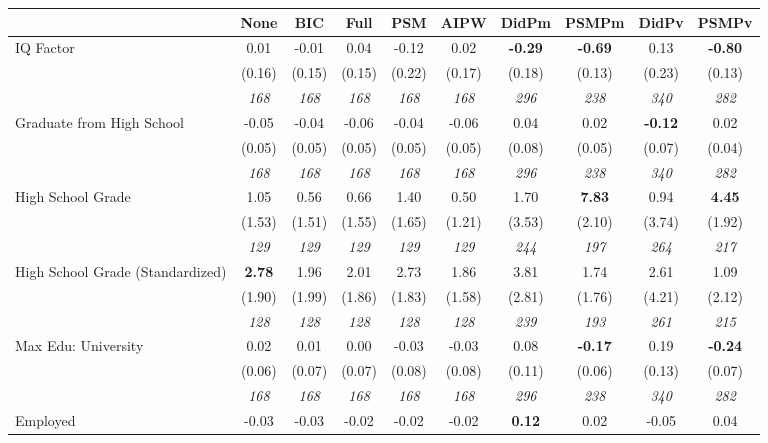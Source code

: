 \begin{tabular}{l c c c c c c c c c}
\toprule
 & None & BIC & Full & PSM & AIPW & DidPm & PSMPm & DidPv & PSMPv \\
\midrule
IQ Factor & 0.01 & -0.01 & 0.04 & -0.12 & 0.02 & \textbf{ -0.29 } & \textbf{-0.69} & 0.13 & \textbf{-0.80} \\
& (0.16) & (0.15) & (0.15) & (0.22) & (0.17) & (0.18) & (0.13) & (0.23) & (0.13) \\
& \textit{ 168 } & \textit{ 168 } & \textit{ 168 } & \textit{ 168 } & \textit{ 168 } & \textit{ 296 } & \textit{ 238 } & \textit{ 340 } & \textit{ 282 } \\
Graduate from High School & -0.05 & -0.04 & -0.06 & -0.04 & -0.06 & 0.04 & 0.02 & \textbf{ -0.12 } & 0.02 \\
& (0.05) & (0.05) & (0.05) & (0.05) & (0.05) & (0.08) & (0.05) & (0.07) & (0.04) \\
& \textit{ 168 } & \textit{ 168 } & \textit{ 168 } & \textit{ 168 } & \textit{ 168 } & \textit{ 296 } & \textit{ 238 } & \textit{ 340 } & \textit{ 282 } \\
High School Grade & 1.05 & 0.56 & 0.66 & 1.40 & 0.50 & 1.70 & \textbf{7.83} & 0.94 & \textbf{4.45} \\
& (1.53) & (1.51) & (1.55) & (1.65) & (1.21) & (3.53) & (2.10) & (3.74) & (1.92) \\
& \textit{ 129 } & \textit{ 129 } & \textit{ 129 } & \textit{ 129 } & \textit{ 129 } & \textit{ 244 } & \textit{ 197 } & \textit{ 264 } & \textit{ 217 } \\
High School Grade (Standardized) & \textbf{ 2.78 } & 1.96 & 2.01 & 2.73 & 1.86 & 3.81 & 1.74 & 2.61 & 1.09 \\
& (1.90) & (1.99) & (1.86) & (1.83) & (1.58) & (2.81) & (1.76) & (4.21) & (2.12) \\
& \textit{ 128 } & \textit{ 128 } & \textit{ 128 } & \textit{ 128 } & \textit{ 128 } & \textit{ 239 } & \textit{ 193 } & \textit{ 261 } & \textit{ 215 } \\
Max Edu: University & 0.02 & 0.01 & 0.00 & -0.03 & -0.03 & 0.08 & \textbf{-0.17} & 0.19 & \textbf{-0.24} \\
& (0.06) & (0.07) & (0.07) & (0.08) & (0.08) & (0.11) & (0.06) & (0.13) & (0.07) \\
& \textit{ 168 } & \textit{ 168 } & \textit{ 168 } & \textit{ 168 } & \textit{ 168 } & \textit{ 296 } & \textit{ 238 } & \textit{ 340 } & \textit{ 282 } \\
Employed & -0.03 & -0.03 & -0.02 & -0.02 & -0.02 & \textbf{ 0.12 } & 0.02 & -0.05 & 0.04 \\

\end{tabular}
